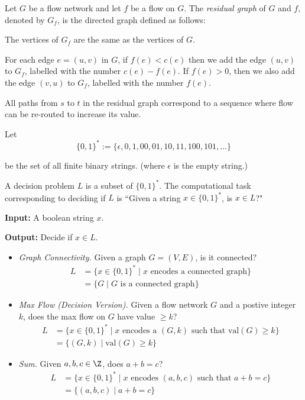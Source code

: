 Let $G$ be a flow network and let $f$ be a flow on $G$. The
\textit{residual graph} of $G$ and $f$, denoted by $G_f$, is the
directed graph defined as follows:

The vertices of $G_f$ are the same as the vertices of $G$.

For each edge $e=(u,v)$ in $G$, if $f(e)<c(e)$ then we add the edge
$(u,v)$ to $G_f$, labelled with the number $c(e)-f(e)$. If $f(e)>0$,
then we also add the edge $(v,u)$ to $G_f$, labelled with the number
$f(e)$.

All paths from $s$ to $t$ in the residual graph correspond to a
sequence where flow can be re-routed to increase its value.

\def\binrep{\{0,1\}^*}

Let
$$\binrep:=\{\epsilon,0,1,00,01,10,11,100,101,\ldots\}$$

be the set of all finite binary strings. (where $\epsilon$ is the
empty string.)


A decision problem $L$ is a subset of $\binrep$. The computational
task corresponding to deciding if $L$ is ``Given a string
$x\in\binrep$, is $x\in L$?"


\textbf{Input:} A boolean string $x$.

\textbf{Output:} Decide if $x\in L$.


\begin{itemize}
	\def\B{\binrep}
	\item\textit{Graph Connectivity.} Given a graph $G=(V,E)$, is it
	      connected?
	      \begin{align*}
		      L & =\{x\in\B\mid x\text{ encodes a connected graph}\} \\
		        & =\{G \mid G \text{ is a connected graph}\}
	      \end{align*}
	\item\textit{Max Flow (Decision Version).} Given a flow network
	      $G$ and a postive integer $k$, does the max flow on $G$ have
	      value $\geq k$?
	      \begin{align*}
		      L & =\{x\in\B\mid x\text{ encodes a $(G,k)$ such that $\text{val}(G)\geq k$}\} \\
		        & =\{(G,k)\mid\text{val}(G)\geq k \}
	      \end{align*}
	\item\textit{Sum.} Given $a,b,c\in\Z$, does $a+b=c$?
	      \begin{align*}
		      L & =\{x\in\B\mid x\text{ encodes $(a,b,c)$ such that $a+b=c$}\} \\
		        & =\{(a,b,c)\mid a+b=c\}
	      \end{align*}
\end{itemize}

